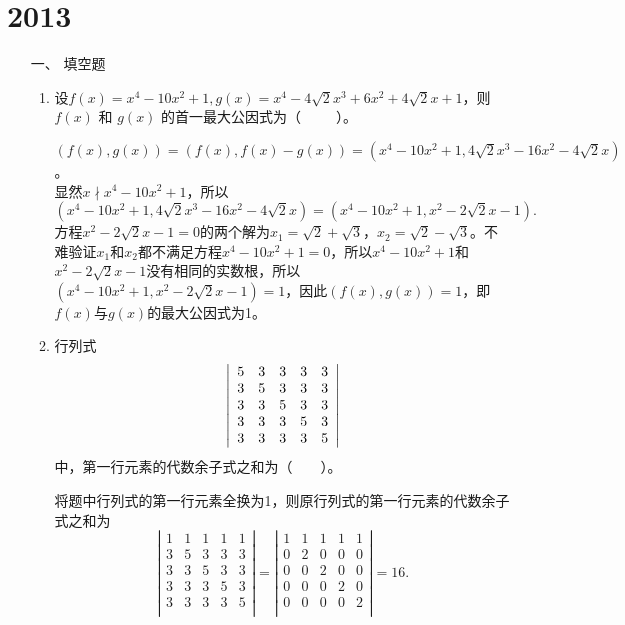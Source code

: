 \section{2013}
\begin{enumerate}[1~]
\renewcommand{\labelenumi}{\textbf{\theenumi. }}
\renewcommand{\Im}{\text{Im }}
\item[一、]填空题 
\begin{enumerate}[1.~]
\item
设$f ( x ) = x ^ { 4 } - 10 x ^ { 2 } + 1 ,  g ( x ) = x ^ { 4 } - 4 \sqrt { 2 } x ^ { 3 } + 6 x ^ { 2 } + 4 \sqrt { 2 } x + 1$，则 $f(x)$ 和 $g(x)$ 的首一最大公因式为（\ \ \ \ \ ）。
\begin{solution}
$(f(x), g(x)) = (f(x), f(x)-g(x)) = (x^4 - 10x^2 +1, 4\sqrt{2} x^3-16 x^2-4\sqrt{2}x)$。\\
显然$x \nmid x^4-10x^2 +1$，所以\[
(x^4 -10x^2+1, 4 \sqrt { 2 } x ^ { 3 } -1 6 x ^ { 2 } - 4 \sqrt { 2 } x ) = (x^4 -10x^2+1,  x ^ { 2 } - 2 \sqrt { 2 } x -1 ). \]
方程$x^2 -2\sqrt{2}x -1 = 0$的两个解为$x_1 = \sqrt{2}+\sqrt{3}$，$x_2 = \sqrt{2} -\sqrt{3}$。不难验证$x_1$和$x_2$都不满足方程$x^4-10x^2+1 = 0$，所以$x^4-10x^2+1$和$x^2-2\sqrt{2}x-1$没有相同的实数根，所以$(x^4-10x^2+1, x^2-2\sqrt{2}x-1) = 1$，因此$(f(x), g(x)) = 1$，即$f(x)$与$g(x)$的最大公因式为1。
\end{solution}

\item 
行列式
$$\left| \begin{array} { c c c c c } { 5 } & { 3 } & { 3 } & { 3 } & { 3 } \\ { 3 } & { 5 } & { 3 } & { 3 } & { 3 } \\ { 3 } & { 3 } & { 5 } & { 3 } & { 3 } \\ { 3 } & { 3 } & { 3 } & { 5 } & { 3 } \\ { 3 } & { 3 } & { 3 } & { 3 } & { 5 } \end{array} \right|$$
中，第一行元素的代数余子式之和为（\ \ \ \ ）。
\begin{solution}
将题中行列式的第一行元素全换为1，则原行列式的第一行元素的代数余子式之和为
$$\left| \begin{matrix}
	1&		1&		1&		1&		1\\
	3&		5&		3&		3&		3\\
	3&		3&		5&		3&		3\\
	3&		3&		3&		5&		3\\
	3&		3&		3&		3&		5\\
\end{matrix} \right|=\left| \begin{matrix}
	1&		1&		1&		1&		1\\
	0&		2&		0&		0&		0\\
	0&		0&		2&		0&		0\\
	0&		0&		0&		2&		0\\
	0&		0&		0&		0&		2\\
\end{matrix} \right|=16.$$
\end{solution}


\end{enumerate}
\end{enumerate}
